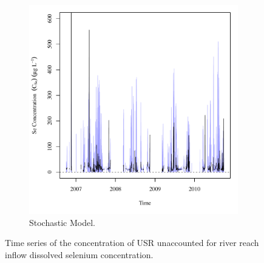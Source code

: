 \begin{linenumbers}
\begin{figure}[htbp]
\begin{subfigure}{0.5\textwidth}
		\includegraphics[width=0.9\linewidth]{"Figures/Results_USR/Balance Cin"}
		\caption{Stochastic Model.}
	\end{subfigure}
	\caption[Time series of the concentration of USR unaccounted for river reach inflow dissolved selenium concentration.]{Time series of the concentration of USR unaccounted for river reach inflow dissolved selenium concentration.}
	\label{fig:USRCin}
\end{figure}


\end{linenumbers}
